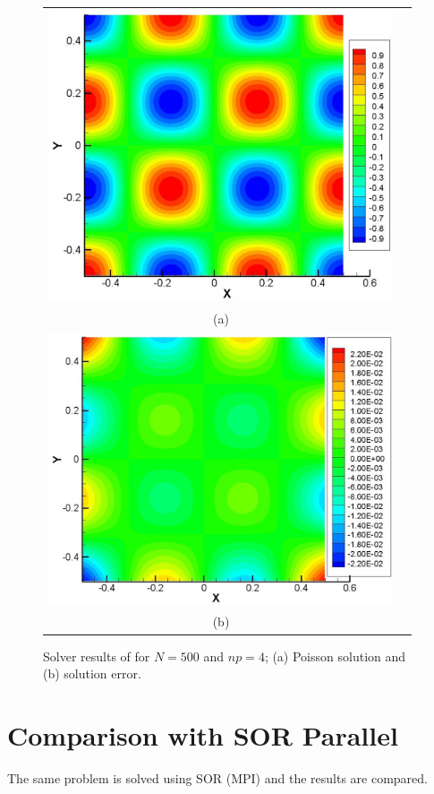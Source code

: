\begin{figure}
\begin{center}
{\tiny
\begin{tabular}{cc}
\includegraphics[width=4.0in]{sol_N500_np1.eps} \\
(a) \\
\includegraphics[width=4.0in]{err_N500_np1.eps} \\
(b)
\end{tabular}}
\end{center}

\caption{Solver results of for $N=500$ and $np=4$; (a) Poisson solution and (b) solution error.}
\label{fig:dsmc_cfd1}
\end{figure}
\newpage
\section{Comparison with SOR Parallel}
The same problem is solved using SOR (MPI) and the results are compared.

